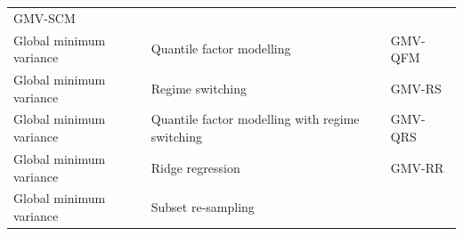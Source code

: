 \documentclass[
]{article}
\begin{document}
\begin{longtable}[]{@{}lll@{}}
\begin{minipage}[t]{0.14\columnwidth}
GMV-SCM\strut
\end{minipage}\tabularnewline
\begin{minipage}[t]{0.27\columnwidth}\raggedright
Global minimum variance\strut
\end{minipage} & \begin{minipage}[t]{0.50\columnwidth}\raggedright
Quantile factor modelling\strut
\end{minipage} & \begin{minipage}[t]{0.14\columnwidth}\raggedright
GMV-QFM\strut
\end{minipage}\tabularnewline
\begin{minipage}[t]{0.27\columnwidth}\raggedright
Global minimum variance\strut
\end{minipage} & \begin{minipage}[t]{0.50\columnwidth}\raggedright
Regime switching\strut
\end{minipage} & \begin{minipage}[t]{0.14\columnwidth}\raggedright
GMV-RS\strut
\end{minipage}\tabularnewline
\begin{minipage}[t]{0.27\columnwidth}\raggedright
Global minimum variance\strut
\end{minipage} & \begin{minipage}[t]{0.50\columnwidth}\raggedright
Quantile factor modelling with regime switching\strut
\end{minipage} & \begin{minipage}[t]{0.14\columnwidth}\raggedright
GMV-QRS\strut
\end{minipage}\tabularnewline
\begin{minipage}[t]{0.27\columnwidth}\raggedright
Global minimum variance\strut
\end{minipage} & \begin{minipage}[t]{0.50\columnwidth}\raggedright
Ridge regression\strut
\end{minipage} & \begin{minipage}[t]{0.14\columnwidth}\raggedright
GMV-RR\strut
\end{minipage}\tabularnewline
\begin{minipage}[t]{0.27\columnwidth}\raggedright
Global minimum variance\strut
\end{minipage} & \begin{minipage}[t]{0.50\columnwidth}\raggedright
Subset re-sampling\strut
\end{minipage} & \begin{minipage}[t]{0.14\columnwidth}\raggedright

\end{minipage}
\end{longtable}
\end{document}
